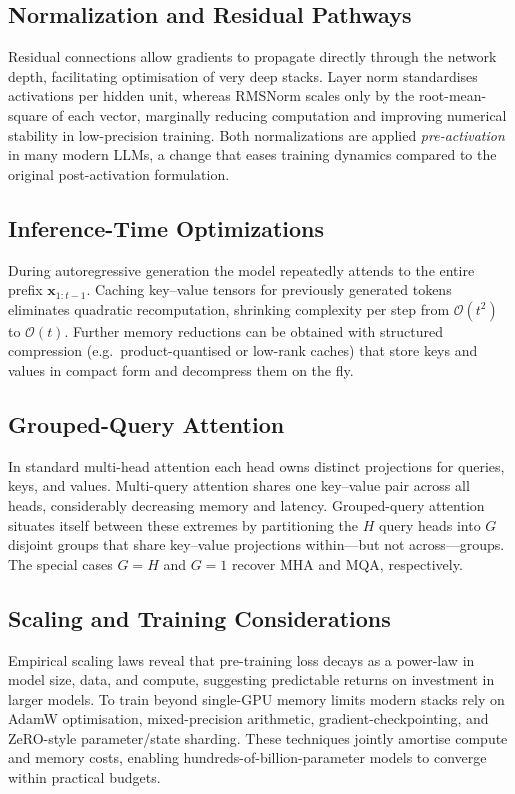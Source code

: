 \subsection{Normalization and Residual Pathways}\label{sec:norm_res}

Residual connections allow gradients to propagate directly through the
network depth, facilitating optimisation of very deep stacks.
Layer norm standardises activations per hidden unit, whereas RMSNorm
scales only by the root-mean-square of each vector, marginally
reducing computation and improving numerical stability in low-precision
training.
Both normalizations are applied \emph{pre-activation} in many modern
LLMs, a change that eases training dynamics compared to the original
post-activation formulation.

\subsection{Inference-Time Optimizations}\label{sec:kv_cache}

During autoregressive generation the model repeatedly attends to the
entire prefix $\mathbf{x}_{1{:}t-1}$.
Caching key–value tensors for previously generated tokens eliminates
quadratic recomputation, shrinking complexity per step from
$\mathcal{O}(t^{2})$ to $\mathcal{O}(t)$.
Further memory reductions can be obtained with structured compression
(e.g.\ product-quantised or low-rank caches) that store keys and values
in compact form and decompress them on the fly.

\subsection{Grouped-Query Attention}\label{sec:gqa}

In standard multi-head attention each head owns distinct projections
for queries, keys, and values.
Multi-query attention shares one key–value pair across all heads,
considerably decreasing memory and latency.
Grouped-query attention situates itself between these extremes by
partitioning the $H$ query heads into $G$ disjoint groups that share
key–value projections within—but not across—groups.
The special cases $G=H$ and $G=1$ recover MHA and MQA, respectively.

\subsection{Scaling and Training Considerations}\label{sec:scaling}

Empirical scaling laws reveal that pre-training loss decays as a
power-law in model size, data, and compute, suggesting predictable
returns on investment in larger models.
To train beyond single-GPU memory limits modern stacks rely on AdamW
optimisation, mixed-precision arithmetic, gradient-checkpointing, and
ZeRO-style parameter/state sharding.
These techniques jointly amortise compute and memory costs, enabling
hundreds-of-billion-parameter models to converge within practical
budgets.
